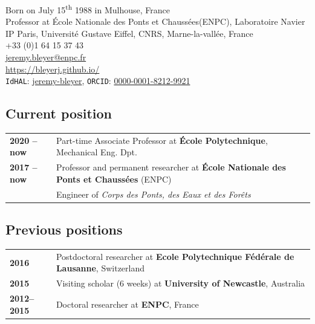 \newcommand{\ENPC}{\'Ecole Nationale des Ponts et Chaussées}
{\noindent Born on July 15\textsuperscript{th} 1988 in Mulhouse, France\\
Professor at \ENPC (ENPC), Laboratoire Navier\\
IP Paris, Université Gustave Eiffel, CNRS, Marne-la-vallée, France\\

\noindent{\large\Telefon}\quad  +33 (0)1 64 15 37 43\\
{\large\Letter}\quad \href{mailto:jeremy.bleyer@enpc.fr}{jeremy.bleyer@enpc.fr}\\
{\large\Mundus}\quad \href{https://bleyerj.github.io/}{https://bleyerj.github.io/}\\
\texttt{IdHAL}: \href{https://hal.archives-ouvertes.fr/search/index/q/*/authIdHal_s/jeremy-bleyer}{jeremy-bleyer}, \quad \texttt{ORCID}: \href{https://orcid.org/0000-0001-8212-9921}{0000-0001-8212-9921}}

\subsection*{\textcolor{navier_blue}{Current position}}
\begin{table}[H]
{\renewcommand\tabcolsep{2pt}
\vspace{-0.3cm}
\begin{tabularx}{\textwidth}{p{2.5cm}X}
\textbf{2020 -- now}  & Part-time Associate Professor at \textbf{\'Ecole Polytechnique}, Mechanical Eng. Dpt.\\ 
\textbf{2017 -- now}  & Professor and permanent researcher at \textbf{\ENPC} (ENPC)\\
& Engineer of \textit{Corps des Ponts, des Eaux et des Forêts} 
\end{tabularx}}
\end{table}
\subsection*{\textcolor{navier_blue}{Previous positions}}
\begin{table}[H]
{\renewcommand\tabcolsep{2pt}
\vspace{-0.3cm}
\begin{tabularx}{\textwidth}{p{2.3cm}X}
\textbf{2016} & Postdoctoral researcher at \textbf{Ecole Polytechnique Fédérale de Lausanne}, Switzerland\\
\textbf{2015} & Visiting scholar (6 weeks) at \textbf{University of Newcastle}, Australia\\
\textbf{2012--2015} & Doctoral researcher at \textbf{ENPC}, France
\end{tabularx}}
\end{table}

